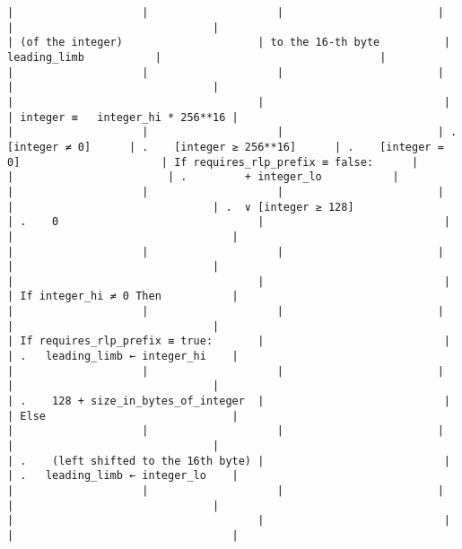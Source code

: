 \documentclass[varwidth=\maxdimen,margin=0.5cm,multi={verbatim}]{standalone}
\begin{document}
\begin{verbatim}
|                    |                    |                        |                         |                               |                                         | (of the integer)                     | to the 16-th byte          | leading_limb           |                                  |
|                    |                    |                        |                         |                               |                                         |                                      |                            |                        | integer ≡   integer_hi * 256**16 |
|                    |                    |                        | .    [integer ≠ 0]      | .    [integer ≥ 256**16]      | .    [integer = 0]                      | If requires_rlp_prefix ≡ false:      |                            |                        | .         + integer_lo           |
|                    |                    |                        |                         |                               | .  ∨ [integer ≥ 128]                    | .    0                               |                            |                        |                                  |
|                    |                    |                        |                         |                               |                                         |                                      |                            |                        | If integer_hi ≠ 0 Then           |
|                    |                    |                        |                         |                               |                                         | If requires_rlp_prefix ≡ true:       |                            |                        | .   leading_limb ← integer_hi    |
|                    |                    |                        |                         |                               |                                         | .    128 + size_in_bytes_of_integer  |                            |                        | Else                             |
|                    |                    |                        |                         |                               |                                         | .    (left shifted to the 16th byte) |                            |                        | .   leading_limb ← integer_lo    |
|                    |                    |                        |                         |                               |                                         |                                      |                            |                        |                                  |

\end{verbatim}
\end{document}
